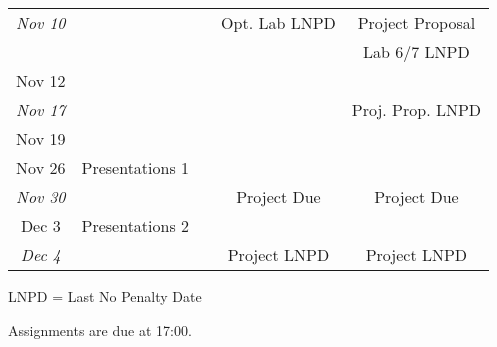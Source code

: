 \documentclass[10pt]{article}
\begin{document}
\begin{tabular}{ccccc}
\hline
{\it Nov 10} &&& Opt. Lab LNPD& Project Proposal\\
&&&&Lab 6/7 LNPD\\
\hline
Nov 12 &&\\
\hline
{\it Nov 17} &&&& Proj. Prop. LNPD\\
\hline
Nov 19 &&\\
\hline
Nov 26 &Presentations 1& \\
\hline
{\it Nov 30} &&& Project Due&Project Due\\
\hline
Dec 3 & Presentations 2&\\
\hline
{\it Dec 4} &&& Project LNPD&Project LNPD\\
\hline
\end{tabular}

LNPD = Last No Penalty Date

Assignments are due at 17:00.
\end{document}
